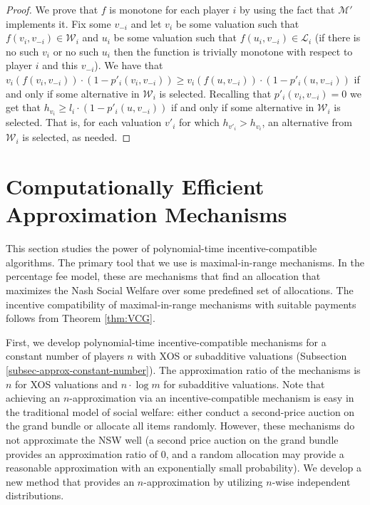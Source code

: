 \documentclass{theoretics}
\newcommand{\cM}{{\mathcal M}}
\begin{document}
\begin{proof}
We prove that $f$ is monotone for each player $i$ by using the fact that $\cM'$ implements it. Fix some $v_{-i}$ and let $v_i$ be some valuation such that $f(v_i,v_{-i})\in \mathcal W_i$ and $u_i$ be some valuation such that $f(u_i,v_{-i})\in \mathcal L_i$ (if there is no such $v_i$ or no such $u_i$ then the function is trivially monotone with respect to player $i$ and this $v_{-i}$). We have that $v_i(f(v_i,v_{-i}))\cdot (1-p'_i(v_i,v_{-i})) \geq v_i(f(u,v_{-i}))\cdot (1-p'_i(u,v_{-i}))$ if and only if some alternative in $\mathcal W_i$ is selected. Recalling that $p'_i(v_i,v_{-i})=0$ we get that $h_{v_i}\geq l_i\cdot (1-p'_i(u,v_{-i}))$ if and only if some alternative in $\mathcal W_i$ is selected. That is, for each valuation $v'_i$ for which $h_{v'_i} > h_{v_i}$, an alternative from $\mathcal W_i$ is selected, as needed.
\end{proof}















\section{Computationally Efficient Approximation Mechanisms}\label{sec-approximations}

This section studies the power of polynomial-time incentive-compatible algorithms. The primary tool that we use is maximal-in-range mechanisms. In the percentage fee model, these are mechanisms that find an allocation that maximizes the Nash Social Welfare over some predefined set of allocations. The incentive compatibility of maximal-in-range mechanisms with suitable payments follows from Theorem \ref{thm:VCG}.

First, we develop polynomial-time incentive-compatible mechanisms for a constant number of players $n$ with XOS or subadditive valuations (Subsection \ref{subsec-approx-constant-number}). The approximation ratio of the mechanisms is $n$ for XOS valuations and $n\cdot\log m$ for subadditive valuations. Note that achieving an $n$-approximation via an  incentive-compatible mechanism is easy in the traditional model of social welfare: either conduct a second-price auction on the grand bundle or allocate all items randomly. However, these mechanisms do not approximate the NSW well (a second price auction on the grand bundle provides an approximation ratio of $0$, and a random allocation may provide a reasonable approximation with an exponentially small probability). We develop a new method that provides an $n$-approximation by utilizing $n$-wise independent distributions.
\end{document}
